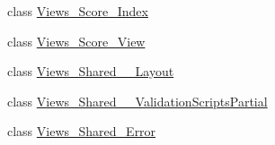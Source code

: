 \begin{DoxyCompactItemize}
class \mbox{\hyperlink{class_asp_net_core_1_1_views___score___index}{Views\+\_\+\+Score\+\_\+\+Index}}
\item 
class \mbox{\hyperlink{class_asp_net_core_1_1_views___score___view}{Views\+\_\+\+Score\+\_\+\+View}}
\item 
class \mbox{\hyperlink{class_asp_net_core_1_1_views___shared_____layout}{Views\+\_\+\+Shared\+\_\+\+\_\+\+Layout}}
\item 
class \mbox{\hyperlink{class_asp_net_core_1_1_views___shared_____validation_scripts_partial}{Views\+\_\+\+Shared\+\_\+\+\_\+\+Validation\+Scripts\+Partial}}
\item 
class \mbox{\hyperlink{class_asp_net_core_1_1_views___shared___error}{Views\+\_\+\+Shared\+\_\+\+Error}}
\end{DoxyCompactItemize}
